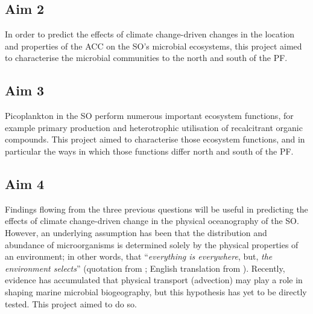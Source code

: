 \subsection{Aim 2}

In order to predict the effects of climate change-driven changes in the location and properties of the \ac{ACC} on the \ac{SO}'s microbial ecosystems, this project aimed to characterise the microbial communities to the north and south of the \ac{PF}.

\subsection{Aim 3}

Picoplankton in the \ac{SO} perform numerous important ecosystem functions, for example primary production and heterotrophic utilisation of recalcitrant organic compounds.
This project aimed to characterise those ecosystem functions, and in particular the ways in which those functions differ north and south of the \ac{PF}.

\subsection{Aim 4}

Findings flowing from the three previous questions will be useful in predicting the effects of climate change-driven change in the physical oceanography of the \ac{SO}.
However, an underlying assumption has been that the distribution and abundance of microorganisms is determined solely by the physical properties of an environment; in other words, that ``\emph{everything is everywhere}, but, \emph{the environment selects}'' (quotation from \citet{Becking:1934um}; English translation from \citet{deWit:2006de}).
Recently, evidence has accumulated that physical transport (advection) may play a role in shaping marine microbial biogeography, but this hypothesis has yet to be directly tested.
This project aimed to do so.
